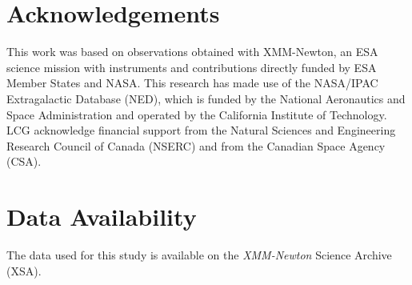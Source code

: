 \documentclass[fleqn,usenatbib]{mnras}
\begin{document}
\section*{Acknowledgements}

This work was based on observations obtained with XMM-Newton, an ESA science mission with instruments and contributions directly funded by ESA Member States and NASA. This research has made use of the NASA/IPAC Extragalactic Database (NED), which is funded by the National Aeronautics and Space Administration and operated by the California Institute of Technology. LCG acknowledge financial support from the Natural Sciences and Engineering Research Council of Canada (NSERC) and from the Canadian Space Agency (CSA).


\section*{Data Availability}

The data used for this study is available on the \textit{XMM-Newton} Science Archive (XSA).











\end{document}
